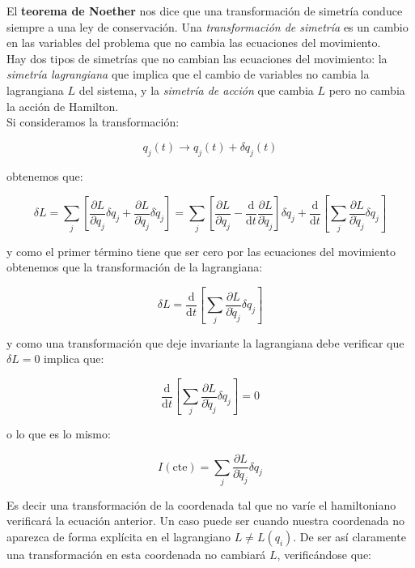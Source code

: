 \documentclass[12pt,a4paper]{book}
\newcommand{\parciales}[2]{\frac{\partial #1}{\partial #2}}
\newcommand{\ccorchetes}[1]{\left[ #1  \right]}
\newcommand{\D}{\mathrm{d}}
\begin{document}
El \textbf{teorema de Noether} nos dice que una transformación de simetría conduce siempre a una ley de conservación. Una \textit{transformación de simetría} es un cambio en las variables del problema que no cambia las ecuaciones del movimiento. \\

Hay dos tipos de simetrías que no cambian las ecuaciones del movimiento: la \textit{simetría lagrangiana} que implica que el cambio de variables no cambia la lagrangiana $L$ del sistema, y la \textit{simetría de acción} que cambia $L$ pero no cambia la acción de Hamilton. \\

Si consideramos la transformación:

\begin{equation}
q_j (t)   \longrightarrow q_j (t) + \delta q_j (t)
\end{equation}

obtenemos que:

\begin{equation}
\delta L = \sum_j \ccorchetes{\parciales{L}{q_j} \delta q_j + \parciales{L}{\dot{q}_j} \delta \dot{q}_j } = \sum_j \ccorchetes{\parciales{L}{q_j} - \dfrac{\D}{\D t} \parciales{L}{\dot{q}_j} } \delta q_j + \dfrac{\D}{\D t} \ccorchetes{\sum_j \parciales{L}{\dot{q}_j} \delta q_j }
\end{equation}

y como el primer término tiene que ser cero por las ecuaciones del movimiento obtenemos que la transformación de la lagrangiana:

\begin{equation}
\delta L = \dfrac{\D}{\D t} \ccorchetes{\sum_j \parciales{L}{\dot{q}_j} \delta q_j }
\end{equation}

y como una transformación que deje invariante la lagrangiana debe verificar que $\delta L = 0$ implica que:

$$ \dfrac{\D}{\D t} \ccorchetes{\sum_j \parciales{L}{\dot{q}_j} \delta q_j } = 0 $$

o lo que es lo mismo:

\begin{equation}
I (\mathrm{cte}) = \sum_j \parciales{L}{\dot{q}_j} \delta q_j
\end{equation}

Es decir una transformación de la coordenada tal que no varíe el hamiltoniano verificará la ecuación anterior. Un caso puede ser cuando nuestra coordenada no aparezca de forma explícita en el lagrangiano $L \neq L(q_i)$. De ser así claramente una transformación en esta coordenada no cambiará $L$, verificándose que:
\end{document}
